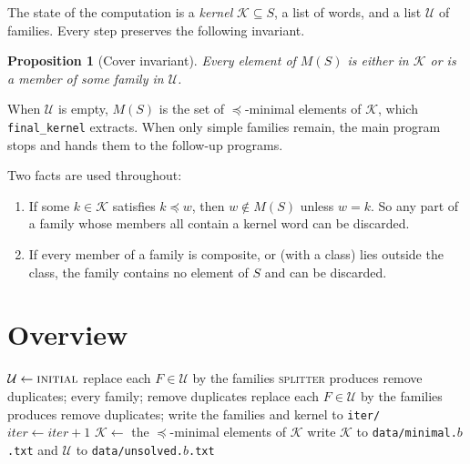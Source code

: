 \documentclass[11pt]{article}
\newtheorem{proposition}[lemma]{Proposition}
\theoremstyle{definition}
\theoremstyle{remark}
\newcommand{\K}{\mathcal{K}}
\newcommand{\U}{\mathcal{U}}
\newcommand{\code}[1]{\texttt{#1}}
\newcommand{\sw}{\preceq}   %
\begin{document}
The state of the computation is a \emph{kernel} $\K\subseteq S$, a list of words, and a list $\U$ of families. Every step preserves the following invariant.

\begin{proposition}[Cover invariant]\label{prop:cover}
Every element of $M(S)$ is either in $\K$ or is a member of some family in $\U$.
\end{proposition}

When $\U$ is empty, $M(S)$ is the set of $\sw$-minimal elements of $\K$, which \code{final\_kernel} extracts. When only simple families remain, the main program stops and hands them to the follow-up programs.

Two facts are used throughout:
\begin{enumerate}[label=(\alph*)]
\item If some $k\in\K$ satisfies $k\sw w$, then $w\notin M(S)$ unless $w=k$. So any part of a family whose members all contain a kernel word can be discarded.
\item If every member of a family is composite, or (with a class) lies outside the class, the family contains no element of $S$ and can be discarded.
\end{enumerate}

\section{Overview}

\begin{algorithm}[h]
\caption{\code{compute\_base} for one base}\label{alg:main}
\begin{algorithmic}[1]
\State $\U \gets \Call{initial}{}$ 
\While{$\U$ contains a non-simple family}
  \Repeat
        \State replace each $F\in\U$ by the families \textsc{splitter} produces
        \State remove duplicates;  every family; remove duplicates
     \EndFor
  \State replace each $F\in\U$ by the families  produces
  \State remove duplicates; write the families and kernel to \code{iter/}
  \State $\textit{iter}\gets \textit{iter}+1$
\EndWhile
\State $\K\gets$ the $\sw$-minimal elements of $\K$
\State write $\K$ to \code{data/minimal.$b$.txt} and $\U$ to \code{data/unsolved.$b$.txt}
\end{algorithmic}
\end{algorithm}
\end{document}
